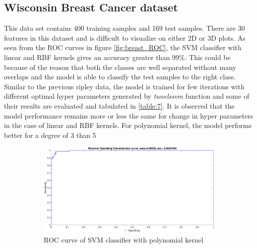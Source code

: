 {\subsection{Wisconsin Breast Cancer dataset}
This data set contains   400 training samples and 169  test samples. There are 30 features in this dataset and is difficult to visualize on either 2D or 3D plots. As seen from the ROC curves in figure \ref{fig:breast_ROC}, the SVM classifier with linear and RBF kernels gives an accuracy greater than 99\%. This could be because of the reason that both the classes are well separated without many overlaps and the model is able to classify the test samples to the right class. Similar to the previous ripley data, the model is trained for few iterations with different optimal hyper parameters generated by \textit{tunelssvm} function and some of their results are evaluated and tabulated in \ref{table:7}. It is observed that the model performance remains more or less the same for change in hyper parameters in the case of linear and RBF kernels. For polynomial kernel, the model performs better for a degree of 3 than 5
\begin{figure}[!ht] 
	\centering
	\begin{subfigure}{.35\textwidth}
		\centering
		\captionsetup{width=0.8\linewidth}
		\includegraphics[height=.65\linewidth, width=0.9\linewidth]{Exercise1/Report/breast/breast_lin_ROC.eps}
		\caption{ROC curve of SVM classifier with polynomial kernel}
		\label{fig:breast_lin_ROC}
	\end{subfigure}%
	\begin{subfigure}{.35\textwidth}
		\centering
		\captionsetup{width=0.8\linewidth}

\end{subfigure}
\end{figure}}
